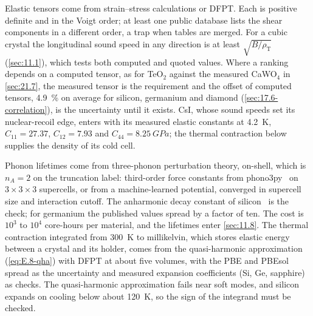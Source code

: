Elastic tensors come from strain--stress calculations or DFPT. Each is positive definite and in the Voigt order; at least one public database lists the shear components in a different order, a trap when tables are merged. For a cubic crystal the longitudinal sound speed in any direction is at least $\sqrt{B/\rho_{\mathrm{T}}}$ (\cref{sec:11.1}), which tests both computed and quoted values. Where a ranking depends on a computed tensor, as for TeO$_2$ against the measured CaWO$_4$ in \cref{sec:21.7}, the measured tensor is the requirement and the offset of computed tensors, \SI{4.9}{\percent} on average for silicon, germanium and diamond (\cref{sec:17.6-correlation}), is the uncertainty until it exists. CsI, whose sound speeds set its nuclear-recoil edge, enters with its measured elastic constants at \SI{4.2}{K}, $C_{11} = 27.37$, $C_{12} = 7.93$ and $C_{44} = \SI{8.25}{GPa}$; the thermal contraction below supplies the density of its cold cell.

Phonon lifetimes come from three-phonon perturbation theory, on-shell, which is $n_A = 2$ on the truncation label: third-order force constants from phono3py~\cite{togo2015distributions} on $3\times3\times3$ supercells, or from a machine-learned potential, converged in supercell size and interaction cutoff. The anharmonic decay constant of silicon~\cite{tamura1985spontaneous} is the check; for germanium the published values spread by a factor of ten. The cost is $10^3$ to $10^4$ core-hours per material, and the lifetimes enter \cref{sec:11.8}. The thermal contraction integrated from \SI{300}{K} to millikelvin, which stores elastic energy between a crystal and its holder, comes from the quasi-harmonic approximation (\cref{eq:E.8-qha}) with DFPT at about five volumes, with the PBE and PBEsol spread as the uncertainty and measured expansion coefficients (Si, Ge, sapphire) as checks. The quasi-harmonic approximation fails near soft modes, and silicon expands on cooling below about \SI{120}{K}, so the sign of the integrand must be checked.
